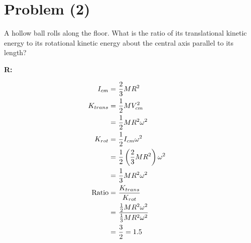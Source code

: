 \section{Problem (2)}

	A hollow ball rolls along the floor. What is the ratio of its translational kinetic energy to its rotational kinetic energy about the central axis parallel to its length?

	\textbf{R:}

	\begin{align}
		I_{cm} = \ &\frac{2}{3} MR^{2}& \notag \\
		K_{trans} = \ &\frac{1}{2} MV_{cm}^{2}& \notag \\
		= \ &\frac{1}{2} MR^{2}\omega^{2}& \notag \\
		K_{rot} = \ &\frac{1}{2} I_{cm}\omega^{2}& \notag \\
		= \ &\frac{1}{2} \left(\frac{2}{3} MR^{2}\right)\omega^{2}& \notag \\
		= \ &\frac{1}{3} MR^{2}\omega^{2}& \notag \\
		\text{Ratio} = \ &\frac{K_{trans}}{K_{rot}}& \notag \\
		= \ &\frac{\frac{1}{2} MR^{2}\omega^{2}}{\frac{1}{3} MR^{2}\omega^{2}}& \notag \\
		= \ &\frac{3}{2} = 1.5&
	\end{align}
